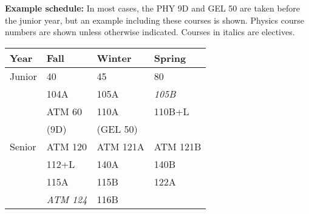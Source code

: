 \documentclass[12pt]{article}
\begin{document}
\noindent
{\bf Example schedule:} In most cases, the PHY 9D and GEL 50 are taken
before the junior year, but an example including these courses is
shown.  Physics course numbers are shown unless otherwise indicated.
Courses in italics are electives.
\begin{center}
\begin{tabular}{|l|l|l|l|}
\hline
Year      & Fall    & Winter & Spring \\
\hline
Junior    & 40         & 45           & 80 \\
          & 104A       & 105A         & {\it 105B} \\
          & ATM 60     & 110A         & 110B+L \\
          & (9D)       & (GEL 50)     & \\
\hline
Senior   & ATM 120       & ATM 121A   & ATM 121B \\
         & 112+L         & 140A       & 140B \\
         & 115A          & 115B       & 122A \\
         & {\it ATM 124} & 116B       &  \\
\hline
\end{tabular}
\end{center}
\end{document}
